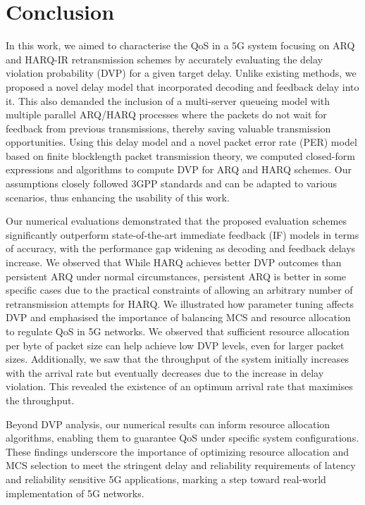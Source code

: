 \section{Conclusion}\label{sec:conclusion}
In this work, we aimed to characterise the QoS in a 5G system focusing on ARQ and HARQ-IR retransmission schemes by accurately evaluating the delay violation probability (DVP) for a given target delay. 
Unlike existing methods, we proposed a novel delay model that incorporated decoding and feedback delay into it. This also demanded the inclusion of a multi-server queueing model with multiple parallel ARQ/HARQ processes where the packets do not wait for feedback from previous transmissions, thereby saving valuable transmission opportunities. 
Using this delay model and a novel packet error rate (PER) model based on finite blocklength packet transmission theory, we computed closed-form expressions and algorithms to compute DVP for ARQ and HARQ schemes. 
Our assumptions closely followed 3GPP standards and can be adapted to various scenarios, thus enhancing the usability of this work.

Our numerical evaluations demonstrated that the proposed evaluation schemes significantly outperform state-of-the-art immediate feedback (IF) models in terms of accuracy, with the performance gap widening as decoding and feedback delays increase. 
We observed that While HARQ achieves better DVP outcomes than persistent ARQ under normal circumstances, persistent ARQ is better in some specific cases due to the practical constraints of allowing an arbitrary number of retransmission attempts for HARQ. 
We illustrated how parameter tuning affects DVP and emphasised the importance of balancing MCS and resource allocation to regulate QoS in 5G networks. 
We observed that sufficient resource allocation per byte of packet size can help achieve low DVP levels, even for larger packet sizes. 
Additionally, we saw that the throughput of the system initially increases with the arrival rate but eventually decreases due to the increase in delay violation. This revealed the existence of an optimum arrival rate that maximises the throughput.

Beyond DVP analysis, our numerical results can inform resource allocation algorithms, enabling them to guarantee QoS under specific system configurations. 
These findings underscore the importance of optimizing resource allocation and MCS selection to meet the stringent delay and reliability requirements of latency and reliability sensitive 5G applications, marking a step toward real-world implementation of 5G networks. 
